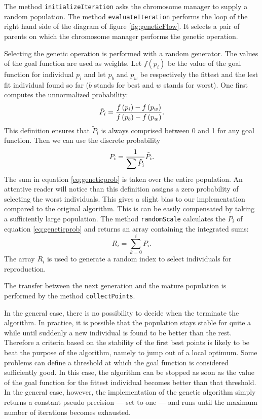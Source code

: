\documentclass[twoside]{book}
\begin{document}
The method {\tt initializeIteration} asks the chromosome manager
to supply a random population. The method {\tt evaluateIteration}
performs the loop of the right hand side of the diagram of figure
\ref{fig:geneticFlow}. It selects a pair of parents on which the
chromosome manager performs the genetic operation.

Selecting the genetic operation is performed with a random
generator. The values of the goal function are used as weights.
Let $f\left(p_i\right)$ be the value of the goal function for
individual $p_i$ and let $p_b$ and $p_w$ be respectively the
fittest and the lest fit individual found so far ($b$ stands for
best and $w$ stands for worst). One first computes the
unnormalized probability:
\begin{equation}
  \tilde{P}_i={\displaystyle f\left(p_i\right) - f\left(p_w\right)
  \over\displaystyle f\left(p_b\right) - f\left(p_w\right)}.
\end{equation}
This definition ensures that $\tilde{P}_i$ is always comprised
between 0 and 1 for any goal function. Then we can use the
discrete probability
\begin{equation}
\label{eq:geneticprob}
  P_i={\displaystyle  1
  \over\displaystyle \sum\tilde{P}_i} \tilde{P}_i.
\end{equation}
The sum in equation \ref{eq:geneticprob} is taken over the entire
population. An attentive reader will notice than this definition
assigns a zero probability of selecting the worst individuals.
This gives a slight bias to our implementation compared to the
original algorithm. This is can be easily compensated by taking a
sufficiently large population. The method {\tt randomScale}
calculates the $P_i$ of equation \ref{eq:geneticprob} and returns
an array containing the integrated sums:
\begin{equation}
  R_i=\sum_{k=0}^i P_i.
\end{equation}
The array $R_i$ is used to generate a random index to select
individuals for reproduction.

\noindent The transfer between the next generation and the mature
population is performed by the method {\tt collectPoints}.

In the general case, there is no possibility to decide when the
terminate the algorithm. In practice, it is possible that the
population stays stable for quite a while until suddenly a new
individual is found to be better than the rest. Therefore a
criteria based on the stability of the first best points is likely
to be beat the purpose of the algorithm, namely to jump out of a
local optimum. Some problems can define a threshold at which the
goal function is considered sufficiently good. In this case, the
algorithm can be stopped as soon as the value of the goal function
for the fittest individual becomes better than that threshold. In
the general case, however, the implementation of the genetic
algorithm simply returns a constant pseudo precision
--- set to one --- and runs until the maximum number of iterations
becomes exhausted.
\end{document}
